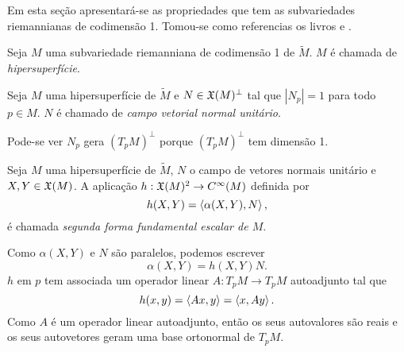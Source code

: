 Em esta seção apresentará-se as propriedades que tem as subvariedades riemannianas de codimensão 1.
Tomou-se como referencias os livros \cite{Lee1997} e \cite{Gallot2004}.

\begin{definicao}
	Seja $M$ uma subvariedade riemanniana de codimensão 1 de $\tilde{M}$. $M$ é chamada de \emph{hipersuperfície}.
\end{definicao}

\begin{definicao}
	Seja $M$ uma hipersuperfície de $\tilde{M}$ e
	$N \in \mathfrak{X}(M)^\perp$ tal que $|N_p|=1$ para todo $p \in M$.
	$N$ é chamado de \emph{campo vetorial normal unitário}.
\end{definicao}

Pode-se ver $N_p$ gera $\left(T_p M\right)^\perp$ porque $\left(T_p M\right)^\perp$ tem dimensão 1.

\begin{definicao}
	Seja $M$ uma hipersuperfície de $\tilde{M}$,
	$N$ o campo de vetores normais unitário e
	$X,Y \in \mathfrak{X}(M)$.
	A aplicação $h: \mathfrak{X}(M)^2 \rightarrow C^\infty(M)$ definida por
	\begin{equation*}
	h(X,Y) = \left\langle \alpha(X,Y),N \right\rangle,
	\end{equation*}
	é chamada \emph{segunda forma fundamental escalar de $M$}.
\end{definicao}
	Como $\alpha(X,Y)$ e $N$ são paralelos, podemos escrever
	\begin{equation*}
	\alpha(X,Y) = h(X,Y) N.
	\end{equation*}
$h$ em $p$ tem associada um operador linear $A: T_p M \rightarrow T_p M$ autoadjunto tal que
	\begin{equation*}
	h(x,y) = \left\langle Ax,y \right\rangle = \left\langle x,Ay \right\rangle.
	\end{equation*}
	Como $A$ é um operador linear autoadjunto, então os seus autovalores são reais e os seus autovetores geram uma base ortonormal de $T_p M$.


